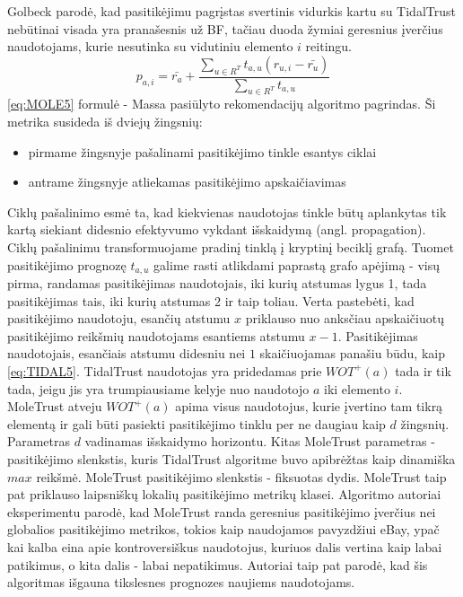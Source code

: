 \documentclass{VUMIFInfMagistrinis}
\begin{document}
\newline
\indent
Golbeck parodė, kad pasitikėjimu pagrįstas svertinis vidurkis kartu su TidalTrust nebūtinai visada yra pranašesnis už BF, tačiau duoda žymiai geresnius įverčius naudotojams, kurie nesutinka su vidutiniu elemento $i$ reitingu.
\begin{equation}\label{eq:MOLE5}
p_{a,i} = \bar{r_a}+\frac{\sum\limits_{u \in R^T}t_{a,u}(r_{u,i}-\bar{r_u})}{\sum\limits_{u \in R^T} t_{a,u}}
\end{equation}
\eqref{eq:MOLE5} formulė - Massa \cite{11} pasiūlyto rekomendacijų algoritmo pagrindas. Ši metrika susideda iš dviejų žingsnių:
\begin{itemize}
	\item pirmame žingsnyje pašalinami pasitikėjimo tinkle esantys ciklai
	\item antrame žingsnyje atliekamas pasitikėjimo apskaičiavimas
\end{itemize}
Ciklų pašalinimo esmė ta, kad kiekvienas naudotojas tinkle būtų aplankytas tik kartą siekiant didesnio efektyvumo vykdant išskaidymą (angl. propagation).
Ciklų pašalinimu transformuojame pradinį tinklą į kryptinį beciklį grafą. Tuomet pasitikėjimo prognozę $t_{a,u}$ galime rasti atlikdami paprastą grafo apėjimą - visų pirma, randamas pasitikėjimas naudotojais, iki kurių atstumas lygus 1, tada pasitikėjimas tais, iki kurių atstumas 2 ir taip toliau. Verta pastebėti, kad pasitikėjimo naudotoju, esančių atstumu $x$ priklauso nuo anksčiau apskaičiuotų pasitikėjimo reikšmių naudotojams esantiems atstumu $x-1$.
\newline
\indent
Pasitikėjimas naudotojais, esančiais atstumu didesniu nei $1$ skaičiuojamas panašiu būdu, kaip \eqref{eq:TIDAL5}. TidalTrust naudotojas yra pridedamas prie $WOT^+(a)$ tada ir tik tada, jeigu jis yra trumpiausiame kelyje nuo naudotojo $a$ iki elemento $i$. MoleTrust atveju $WOT^+(a)$ apima visus naudotojus, kurie įvertino tam tikrą elementą ir gali būti pasiekti pasitikėjimo tinklu per ne daugiau kaip $d$ žingsnių. Parametras $d$ vadinamas išskaidymo horizontu. Kitas MoleTrust parametras - pasitikėjimo slenkstis, kuris TidalTrust algoritme buvo apibrėžtas kaip dinamiška $max$ reikšmė. MoleTrust pasitikėjimo slenkstis - fiksuotas dydis. 
\newline
\indent
MoleTrust taip pat priklauso laipsniškų lokalių pasitikėjimo metrikų klasei. Algoritmo autoriai eksperimentu parodė, kad MoleTrust randa geresnius pasitikėjimo įverčius nei globalios pasitikėjimo metrikos, tokios kaip naudojamos pavyzdžiui eBay, ypač kai kalba eina apie kontroversiškus naudotojus, kuriuos dalis vertina kaip labai patikimus, o kita dalis - labai nepatikimus. Autoriai taip pat parodė, kad šis algoritmas išgauna tikslesnes prognozes naujiems naudotojams.
\end{document}
